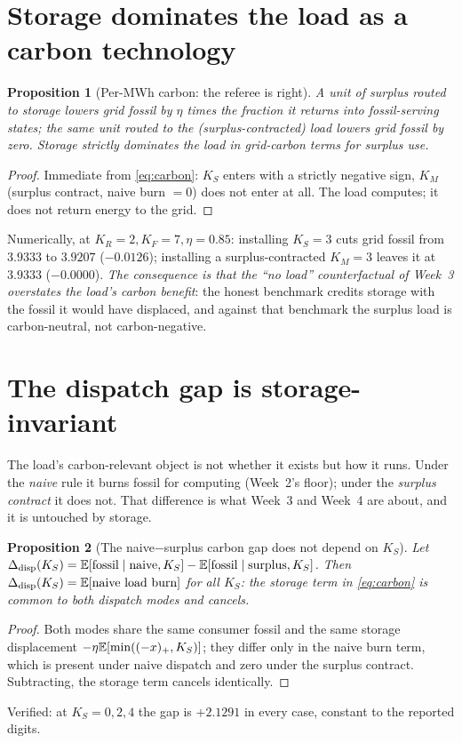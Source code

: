 \documentclass[11pt,reqno]{amsart}
\theoremstyle{plain}\newtheorem{proposition}{Proposition}\newtheorem{corollary}[proposition]{Corollary}
\theoremstyle{remark}\newtheorem{remark}[proposition]{Remark}
\newcommand{\KR}{K_R}\newcommand{\KF}{K_F}\newcommand{\KM}{K_M}\newcommand{\KS}{K_S}
\begin{document}
\section{Storage dominates the load as a carbon technology}
\begin{proposition}[Per-MWh carbon: the referee is right]\label{prop:carbon}
A unit of surplus routed to storage lowers grid fossil by $\eta$ times the fraction it returns
into fossil-serving states; the same unit routed to the (surplus-contracted) load lowers grid
fossil by \emph{zero}. Storage strictly dominates the load in grid-carbon terms for surplus
use.
\end{proposition}
\begin{proof}
Immediate from \eqref{eq:carbon}: $\KS$ enters with a strictly negative sign, $\KM$ (surplus
contract, naive burn $=0$) does not enter at all. The load computes; it does not return energy
to the grid.
\end{proof}
Numerically, at $\KR=2,\KF=7,\eta=0.85$: installing $\KS=3$ cuts grid fossil from $3.9333$ to
$3.9207$ ($-0.0126$); installing a surplus-contracted $\KM=3$ leaves it at $3.9333$
($-0.0000$). \emph{The consequence is that the ``no load'' counterfactual of Week~3 overstates
the load's carbon benefit}: the honest benchmark credits storage with the fossil it would have
displaced, and against that benchmark the surplus load is carbon-neutral, not carbon-negative.

\section{The dispatch gap is storage-invariant}
The load's carbon-relevant object is not whether it exists but how it runs. Under the
\emph{naive} rule it burns fossil for computing (Week~2's floor); under the \emph{surplus
contract} it does not. That difference is what Week~3 and Week~4 are about, and it is
untouched by storage.
\begin{proposition}[The naive$-$surplus carbon gap does not depend on $\KS$]\label{prop:invariant}
Let $\Delta_{\mathrm{disp}}(\KS)=\E[\text{fossil}\mid\text{naive},\KS]-\E[\text{fossil}\mid\text{surplus},\KS]$.
Then $\Delta_{\mathrm{disp}}(\KS)=\E[\text{naive load burn}]$ for all $\KS$: the storage term in
\eqref{eq:carbon} is common to both dispatch modes and cancels.
\end{proposition}
\begin{proof}
Both modes share the same consumer fossil and the same storage displacement $-\eta\E[\min((-x)_+,\KS)]$;
they differ only in the naive burn term, which is present under naive dispatch and zero under
the surplus contract. Subtracting, the storage term cancels identically.
\end{proof}
Verified: at $\KS=0,2,4$ the gap is $+2.1291$ in every case, constant to the reported digits.
\end{document}
